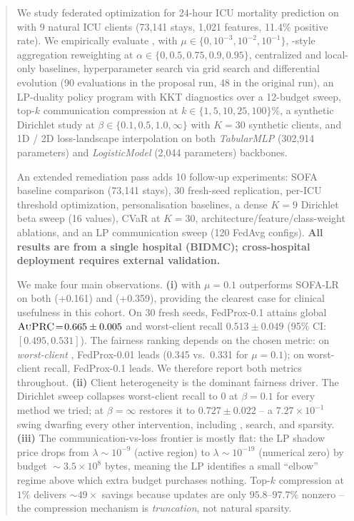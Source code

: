 \begin{abstract}
We study federated optimization for 24-hour ICU mortality prediction on
\mimic{} with 9 natural ICU clients (73{,}141 stays, 1{,}021 features, 11.4\% positive
rate). We empirically evaluate \fedavg{}, \fedprox{} with $\mu \in
\{0,10^{-3},10^{-2},10^{-1}\}$, \cvar{}-style aggregation reweighting at $\alpha
\in \{0, 0.5, 0.75, 0.9, 0.95\}$, centralized and local-only baselines,
hyperparameter search via grid search and differential evolution (90 evaluations
in the proposal run, 48 in the original run), an LP-duality policy program with
KKT diagnostics over a 12-budget sweep, top-$k$ communication compression at
$k\!\in\!\{1,5,10,25,100\}\%$, a synthetic Dirichlet study at $\beta \in \{0.1,
0.5, 1.0, \infty\}$ with $K\!=\!30$ synthetic clients, and 1D / 2D loss-landscape
interpolation on both \emph{TabularMLP} (302{,}914 parameters) and
\emph{LogisticModel} (2{,}044 parameters) backbones.

An extended remediation pass adds 10 follow-up experiments: SOFA baseline comparison (73{,}141 stays), 30 fresh-seed replication, per-ICU threshold optimization, personalisation baselines, a dense $K\!=\!9$ Dirichlet beta sweep (16 values), CVaR at $K\!=\!30$, architecture/feature/class-weight ablations, and an LP communication sweep (120 FedAvg configs). \textbf{All results are from a single hospital (BIDMC); cross-hospital deployment requires external validation.}

We make four main observations. \textbf{(i)} \fedprox{} with $\mu \!=\! 0.1$ outperforms SOFA-LR on both \auroc{} (+0.161) and \auprc{} (+0.359), providing the clearest case for clinical usefulness in this cohort. On 30 fresh seeds, FedProx-0.1 attains global $\auprc \!=\! 0.665 \pm 0.005$ and worst-client recall $0.513 \pm 0.049$ (95\% CI: $[0.495, 0.531]$). The fairness ranking depends on the chosen metric: on \emph{worst-client} \auprc{}, FedProx-0.01 leads (0.345 vs.\ 0.331 for $\mu\!=\!0.1$); on worst-client recall, FedProx-0.1 leads. We therefore report both metrics throughout. \textbf{(ii)}
Client heterogeneity is the dominant fairness driver. The Dirichlet sweep
collapses worst-client recall to $0$ at $\beta \!=\! 0.1$ for every method we tried;
at $\beta \!=\! \infty$ \fedprox{} restores it to $0.727 \pm 0.022$ -- a $7.27 \!\times\!
10^{-1}$ swing dwarfing every other intervention, including \cvar{}, search, and
sparsity. \textbf{(iii)} The communication-vs-loss frontier is mostly flat: the
LP shadow price drops from $\lambda \!\sim\! 10^{-9}$ (active region) to
$\lambda \!\sim\! 10^{-19}$ (numerical zero) by budget $\!\sim\!3.5\!\times\!10^{8}$
bytes, meaning the LP identifies a small ``elbow'' regime above which extra
budget purchases nothing. Top-$k$ compression at $1\%$ delivers $\sim\!49\!\times$ savings
because updates are only $95.8$--$97.7\%$ nonzero -- the compression mechanism is
\emph{truncation}, not natural sparsity.


\end{abstract}
